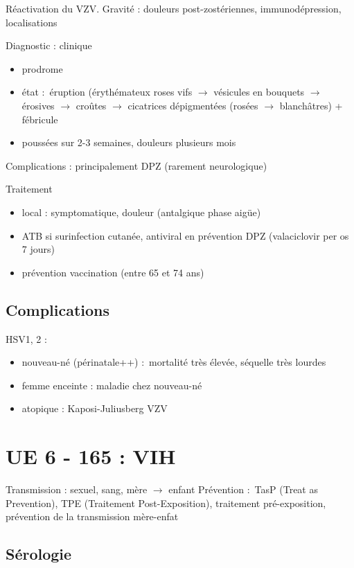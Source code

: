 Réactivation du VZV. Gravité : douleurs post-zostériennes,
immunodépression, localisations

Diagnostic : clinique

\begin{itemize}
\item prodrome
\item état :~éruption (érythémateux roses vifs $\to$ vésicules en
  bouquets $\to$ érosives $\to$ croûtes
  $\to$ cicatrices dépigmentées (rosées $\to$
  blanchâtres) + fébricule
\item poussées sur 2-3 semaines, douleurs plusieurs mois
\end{itemize}

Complications : principalement DPZ (rarement neurologique)

Traitement

\begin{itemize}
\item local : symptomatique, douleur (antalgique phase aigüe)
\item ATB si surinfection cutanée, antiviral en prévention DPZ (valaciclovir
  per os 7 jours)
\item prévention vaccination (entre 65 et 74 ans)
\end{itemize}

\subsection{Complications}

HSV1, 2 :

\begin{itemize}
\item nouveau-né (périnatale++) :~mortalité très élevée, séquelle
très lourdes 
\item femme enceinte : maladie chez nouveau-né 
\item atopique : Kaposi-Juliusberg VZV
\end{itemize}

\section{UE 6 - 165 : VIH}

Transmission : sexuel, sang, mère $\to$ enfant Prévention
:~TasP (Treat as Prevention), TPE (Traitement Post-Exposition),
traitement pré-exposition, prévention de la transmission mère-enfat

\subsection{Sérologie}

